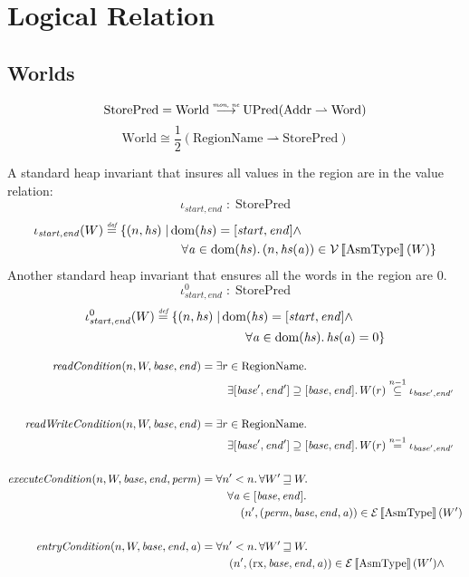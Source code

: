 \documentclass{article}
\newcommand{\sem}[1]{\left\llbracket #1 \right\rrbracket}
\newcommand{\parfun}{\rightharpoonup}
\newcommand{\monnefun}{\stackrel{\textit{\tiny{mon, ne}}}{\longrightarrow}}
\newcommand{\defeq}{\stackrel{\textit{\tiny{def}}}{=}}
\newcommand{\nequal}[1][n]{\stackrel{\tiny{#1}}{=}}
\newcommand{\nsubeq}[1][n]{\stackrel{\tiny{#1}}{\subseteq}}
\DeclareMathOperator{\dom}{dom}
\newcommand{\var}[1]{\mathit{#1}}
\newcommand{\addr}{\var{a}}
\newcommand{\start}{\var{base}}
\newcommand{\addrend}{\var{end}}
\newcommand{\heapseg}{\var{hs}}
\newcommand{\perm}{\var{perm}}
\newcommand{\plainfun}[1]{\mathit{#1}}
\newcommand{\readCond}[1]{\plainfun{readCondition}(#1)}
\newcommand{\writeCond}[1]{\plainfun{readWriteCondition}(#1)}
\newcommand{\execCond}[1]{\plainfun{executeCondition}(#1)}
\newcommand{\entryCond}[1]{\plainfun{entryCondition}(#1)}
\newcommand{\future}{\mathbin{\sqsupseteq}}
\newcommand{\asmType}{\plaindom{AsmType}}
\newcommand{\plaindom}[1]{\mathrm{#1}}
\newcommand{\Words}{\plaindom{Word}}
\newcommand{\Addrs}{\plaindom{Addr}}
\newcommand{\RegionName}{\plaindom{RegionName}}
\newcommand{\Worlds}{\plaindom{World}}
\newcommand{\StorePred}{\plaindom{StorePred}}
\newcommand{\UPred}[1]{\plaindom{UPred}(#1)}
\newcommand{\intr}[2]{\mathcal{#1}\sem{#2}}
\newcommand{\valueintr}[1]{\intr{V}{#1}}
\newcommand{\exprintr}[1]{\intr{E}{#1}}
\newcommand{\stdvr}{\valueintr{\asmType}}
\newcommand{\stder}{\exprintr{\asmType}}
\newcommand{\npair}[2][n]{\left(#1,#2 \right)}
\newcommand{\plainperm}[1]{\mathrm{#1}}
\newcommand{\exec}{\plainperm{rx}}
\begin{document}
\section{Logical Relation}
\label{sec:logical-relation}
\subsection{Worlds}
\[
  \StorePred = \Worlds \monnefun \UPred{\Addrs \parfun \Words}
\]
\[
\Worlds \cong \frac{1}{2} (\RegionName \parfun \StorePred)
\]

A standard heap invariant that insures all values in the region are in the value  relation:
\[
  \iota_{\var{start},\var{end}} \; : \; \StorePred
\]
\begin{align*}
  \iota_{\var{start},\var{end}}(W) \defeq  \{ \npair{\heapseg} \mid & \dom(\heapseg) = [\var{start},\var{end}] \land \\
                                                               & \quad \forall \addr \in \dom(\heapseg) \ldotp \npair{\heapseg(\addr)} \in \stdvr(W) \}
\end{align*}
Another standard heap invariant that ensures all the words in the region are 0.
\[
  \iota_{\var{start},\var{end}}^0 \; : \; \StorePred
\]
\begin{align*}
  \iota_{\var{start},\var{end}}^0(W) \defeq \{ \npair{\heapseg} \mid & \dom(\heapseg) = [\var{start},\var{end}] \land \\
                                                                & \qquad \forall \addr \in \dom(\heapseg) \ldotp \heapseg(\addr) = 0  \}
\end{align*}


\begin{align*}
  \readCond{n,W,\start,\addrend} =        & \;\exists r \in \RegionName \ldotp \\
                                          & \;\quad \exists [\start',\addrend'] \supseteq [\start,\addrend] \ldotp W(r) \nsubeq[n-1] \iota_{\start',\addrend'} \\ & \\
  \writeCond{n,W,\start,\addrend} =       & \; \exists r \in \RegionName \ldotp \\
                                          & \;\quad \exists [\start',\addrend'] \supseteq [\start,\addrend] \ldotp W(r) \nequal[n-1] \iota_{\start',\addrend'} \\ & \\
  \execCond{n,W,\start,\addrend,\perm} =  & \; \forall n' < n \ldotp \forall W' \future W \ldotp \\
                                          & \; \quad \forall \addr \in [\start,\addrend] \ldotp \\
                                          & \; \qquad \npair[n']{(\perm,\start,\addrend,\addr)} \in \stder(W') \\ & \\
  \entryCond{n,W,\start,\addrend,\addr} = & \; \forall n' < n \ldotp \forall W' \future W \ldotp \\
                                          & \; \quad \npair[n']{(\exec,\start,\addrend,\addr)} \in \stder(W') \land \\
\end{align*}
\end{document}
